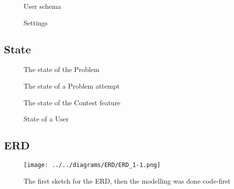 \begin{figure}[h]
    \centering
    \caption{User schema}
\end{figure}

\begin{figure}[h]
    \centering
    \caption{Settings}
\end{figure}

\vspace*{\fill}
\subsection*{State}
\vspace*{\fill}

\begin{landscape}
    \begin{figure}[h]
        \centering
        \caption{The state of the Problem}
    \end{figure}

    \begin{figure}[H]
        \centering
        \caption{The state of a Problem attempt}
    \end{figure}

    \begin{figure}[H]
        \centering
        \caption{The state of the Contest feature}
    \end{figure}
    
    \begin{figure}[H]
        \centering
        \caption{State of a User}
    \end{figure}
\end{landscape}
\pagebreak


\subsection*{ERD}
\begin{figure}[H]
    \centering
    \texttt{[image: ../../diagrams/ERD/ERD\_1-1.png]}
    \caption{The first sketch for the ERD, then the modelling was done code-first}
\end{figure}

